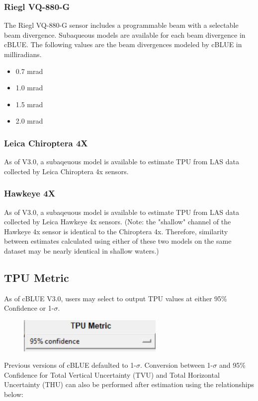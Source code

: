 \documentclass[11pt, a4paper]{article}
\begin{document}
\subsubsection{Riegl VQ-880-G}
The Riegl VQ-880-G sensor includes a programmable beam with a selectable beam divergence. Subaqueous models are available for each beam divergence in cBLUE. The following values are the beam divergences modeled by cBLUE in milliradians.
\begin{itemize}
    \item 0.7 mrad
    \item 1.0 mrad
    \item 1.5 mrad
    \item 2.0 mrad
\end{itemize}
\subsubsection{Leica Chiroptera 4X}
As of V3.0, a subaqeuous model is available to estimate TPU from LAS data collected by Leica Chiroptera 4x sensors.

\subsubsection{Hawkeye 4X}
As of V3.0, a subaqeuous model is available to estimate TPU from LAS data collected by Leica Hawkeye 4x sensors. (Note: the "shallow" channel of the Hawkeye 4x sensor is identical to the Chiroptera 4x. Therefore, similarity between estimates calculated using either of these two models on the same dataset may be nearly identical in shallow waters.)

\subsection{TPU Metric}
As of cBLUE V3.0, users may select to output TPU values at either 95\% Confidence or 1-$\sigma$. 

\begin{figure}[H]
    \centering
    \includegraphics[width=7cm]{figs/metric.png}
\end{figure}

Previous versions of cBLUE defaulted to 1-$\sigma$. Conversion between 1-$\sigma$ and 95\% Confidence for Total Vertical Uncertainty (TVU) and Total Horizontal Uncertainty (THU) can also be performed after estimation using the relationships below:
\end{document}
